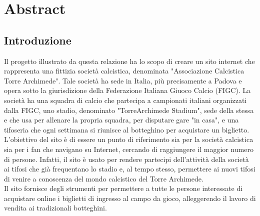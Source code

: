 \section{Abstract}
\subsection{Introduzione}
Il progetto illustrato da questa relazione ha lo scopo di creare un sito internet che rappresenta una fittizia società calcistica, denominata "Associazione Calcistica Torre Archimede". Tale società ha sede in Italia, più precisamente a Padova e opera sotto la giurisdizione della Federazione Italiana Giuoco Calcio (FIGC). La società ha una squadra di calcio che partecipa a campionati italiani organizzati dalla FIGC, uno stadio, denominato "TorreArchimede Stadium", sede della stessa e che usa per allenare la propria squadra, per disputare gare "in casa", e una tifoseria che ogni settimana si riunisce al botteghino per acquistare un biglietto.\\
L'obiettivo del sito è di essere un punto di riferimento sia per la società calcistica sia per i fan che navigano su Internet, cercando di raggiungere il maggior numero di persone. Infatti, il sito è usato per rendere partecipi dell'attività della società ai tifosi che già frequentano lo stadio e, al tempo stesso, permettere ai nuovi tifosi di venire a conoscenza del mondo calcistico del Torre Archimede.\\
Il sito fornisce degli strumenti per permettere a tutte le persone interessate di acquistare online i biglietti di ingresso al campo da gioco, alleggerendo il lavoro di vendita ai tradizionali botteghini.



